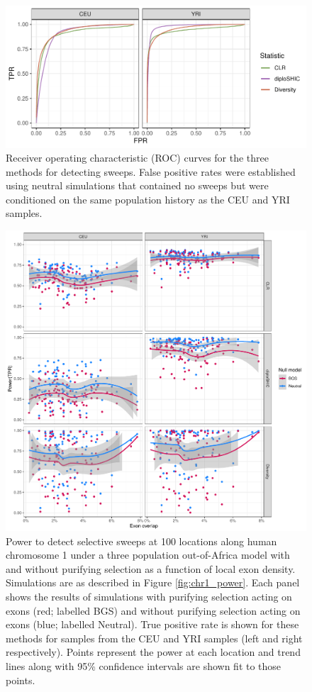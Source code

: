 \documentclass[hidelinks]{article}
\newcommand{\stopsupplement}{%
        \setcounter{table}{0}
        \renewcommand{\thetable}{\arabic{table}}%
        \setcounter{figure}{0}
        \renewcommand{\thefigure}{\arabic{figure}}%
     }
\begin{document}
\begin{figure}
    \centering
    \includegraphics[width=0.8 \textwidth]{figures/sweeps/roc_neutral_null.pdf}
    \caption{
    \label{fig:roc-curves}
    Receiver operating characteristic (ROC) curves for the three methods for detecting sweeps.
    False positive rates were established using neutral simulations that contained no sweeps
    but were conditioned on the same population history as the CEU and YRI samples.
    }
\end{figure}


\begin{figure}
    \centering
    \includegraphics[width=0.8 \textwidth]{figures/sweeps/relationship_power_exon.pdf}
    \caption{
    Power to detect selective sweeps at 100 locations along human chromosome 1 under a three population out-of-Africa model \citep{gutenkunst2009inferring}  
    with and without purifying selection as a function of local exon density.
    Simulations are as described in Figure \ref{fig:chr1_power}.
    Each panel shows the results of simulations with purifying selection acting on exons (red; labelled BGS)
    and without purifying selection acting on exons (blue; labelled Neutral).
    True positive rate is shown for these methods for samples from the CEU and YRI samples (left and right respectively).
    Points represent the power at each location and trend lines along with 95\% confidence intervals are shown fit to those points.
    }
    \label{fig:power-exon}
\end{figure}


\stopsupplement
\end{document}
